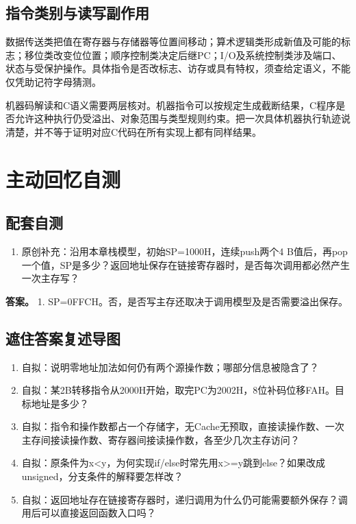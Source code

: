 \subsection{指令类别与读写副作用}\label{CO04-effects}

数据传送类把值在寄存器与存储器等位置间移动；算术逻辑类形成新值及可能的标志；移位类改变位位置；顺序控制类决定后继PC；I/O及系统控制类涉及端口、状态与受保护操作。具体指令是否改标志、访存或具有特权，须查给定语义，不能仅凭助记符字母猜测。

机器码解读和C语义需要两层核对。机器指令可以按规定生成截断结果，C程序是否允许这种执行仍受溢出、对象范围与类型规则约束。把一次具体机器执行轨迹说清楚，并不等于证明对应C代码在所有实现上都有同样结果。

\section{主动回忆自测}\label{CO04-recall}

\subsection{配套自测}\label{CO04-15}

\begin{enumerate}
\def\labelenumi{\arabic{enumi}.}
\tightlist
\item
  原创补充：沿用本章栈模型，初始SP=1000H，连续push两个4 B值后，再pop一个值，SP是多少？返回地址保存在链接寄存器时，是否每次调用都必然产生一次主存写？
\end{enumerate}

\textbf{答案。} 1. SP=0FFCH。否，是否写主存还取决于调用模型及是否需要溢出保存。

\subsection{遮住答案复述导图}\label{CO04-recall-new}

\begin{recallcard}[主动回忆·自拟]

\begin{enumerate}
\def\labelenumi{\arabic{enumi}.}
\setcounter{enumi}{1}
\tightlist
\item
  自拟：说明零地址加法如何仍有两个源操作数；哪部分信息被隐含了？
\item
  自拟：某2B转移指令从2000H开始，取完PC为2002H，8位补码位移FAH。目标地址是多少？
\item
  自拟：指令和操作数都占一个存储字，无Cache无预取，直接读操作数、一次主存间接读操作数、寄存器间接读操作数，各至少几次主存访问？
\item
  自拟：原条件为x\textless y，为何实现if/else时常先用x\textgreater=y跳到else？如果改成unsigned，分支条件的解释要怎样改？
\item
  自拟：返回地址存在链接寄存器时，递归调用为什么仍可能需要额外保存？调用后可以直接返回函数入口吗？
\end{enumerate}

\end{recallcard}

